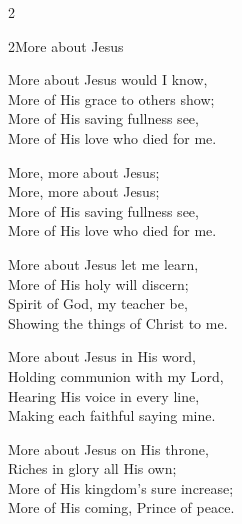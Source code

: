 \begin{multicols}{2}
\begin{hymn}{2}{More about Jesus}{}
\begin{stanza}
More about Jesus would I know,\\
More of His grace to others show;\\
More of His saving fullness see,\\
More of His love who died for me.
\end{stanza}
\begin{chorus}
More, more about Jesus;\\
More, more about Jesus;\\
More of His saving fullness see,\\
More of His love who died for me.
\end{chorus}
\begin{stanza}
More about Jesus let me learn,\\
More of His holy will discern;\\
Spirit of God, my teacher be,\\
Showing the things of Christ to me.
\end{stanza}
\begin{stanza}
More about Jesus in His word,\\
Holding communion with my Lord,\\
Hearing His voice in every line,\\
Making each faithful saying mine.
\end{stanza}
\begin{stanza}
More about Jesus on His throne,\\
Riches in glory all His own;\\
More of His kingdom's sure increase;\\
More of His coming, Prince of peace.
\end{stanza}
\end{hymn}


\end{multicols}

